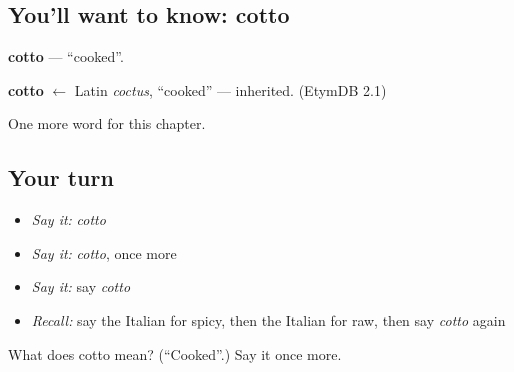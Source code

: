 \subsection*{You'll want to know: cotto}
\textbf{cotto} — \textquotedblleft{}cooked\textquotedblright{}.

\begin{cousinweb}
\textbf{cotto} $\leftarrow$ Latin \emph{coctus}, \textquotedblleft{}cooked\textquotedblright{} — inherited. (EtymDB 2.1)
\end{cousinweb}

\begin{grammarlens}[title={What you've built}]
One more word for this chapter.
\end{grammarlens}

\subsection*{Your turn}
\begin{itemize}
\raggedright
  \item \emph{Say it:} \emph{cotto}
  \item \emph{Say it:} \emph{cotto}, once more
  \item \emph{Say it:} say \emph{cotto}
  \item \emph{Recall:} say the Italian for spicy, then the Italian for raw, then say \emph{cotto} again
\end{itemize}

\begin{tcolorbox}[breakable,colback=teal!4,colframe=teal!35!black,title={Before you move on}]
What does cotto mean? (\textquotedblleft{}Cooked\textquotedblright{}.) Say it once more.
\end{tcolorbox}
